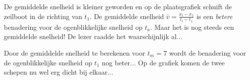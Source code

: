 \documentclass{ximera}
\begin{document}


De gemiddelde snelheid is kleiner geworden en op de plaatsgrafiek schuift de zeilboot in de richting van \(t_1\). 
De gemiddelde snelheid \(\bar{v} = \frac{x_l - x_1}{t_l-t_1}\) is een \textit{betere} benadering voor de ogenblikkelijke snelheid op \(t_a\). 
Maar het is nog steeds een gemiddelde snelheid! 
De lezer raadde het waarschijnlijk al...

Door de gemiddelde snelheid te berekenen voor \(t_m = 7\) wordt de benadering voor de ogenblikkelijke snelheid op \(t_1\) nog beter... 
Op de grafiek komen de twee schepen nu wel erg dicht bij elkaar... 



\end{document}
